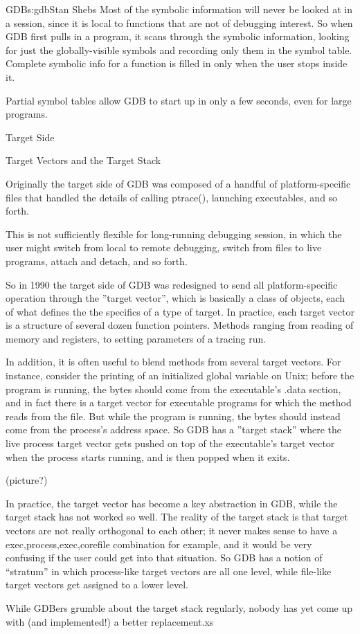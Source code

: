 \begin{aosachapter}{GDB}{s:gdb}{Stan Shebs}
Most of the symbolic information will never be looked at in a session,
since it is local to functions that are not of debugging interest.  So
when GDB first pulls in a program, it scans through the symbolic
information, looking for just the globally-visible symbols and
recording only them in the symbol table.  Complete symbolic info for a
function is filled in only when the user stops inside it.

Partial symbol tables allow GDB to start up in only a few seconds, even
for large programs.

Target Side

Target Vectors and the Target Stack

Originally the target side of GDB was composed of a handful of
platform-specific files that handled the details of calling ptrace(),
launching executables, and so forth.

This is not sufficiently flexible for long-running debugging session,
in which the user might switch from local to remote debugging, switch
from files to live programs, attach and detach, and so forth.

So in 1990 the target side of GDB was redesigned to send all
platform-specific operation through the ''target vector'', which is
basically a class of objects, each of what defines the the specifics
of a type of target.  In practice, each target vector is a structure
of several dozen function pointers.  Methods ranging from reading of
memory and registers, to setting parameters of a tracing run.

In addition, it is often useful to blend methods from several target
vectors.  For instance, consider the printing of an initialized global
variable on Unix; before the program is running, the bytes should come
from the executable's .data section, and in fact there is a target
vector for executable programs for which the method reads from the
file.  But while the program is running, the bytes should instead come
from the process's address space.  So GDB has a ''target stack'' where
the live process target vector gets pushed on top of the executable's
target vector when the process starts running, and is then popped when
it exits.

(picture?)

In practice, the target vector has become a key abstraction in GDB,
while the target stack has not worked so well.  The reality of the
target stack is that target vectors are not really orthogonal to each
other; it never makes sense to have a exec,process,exec,corefile
combination for example, and it would be very confusing if the user
could get into that situation.  So GDB has a notion of ``stratum'' in
which process-like target vectors are all one level, while file-like
target vectors get assigned to a lower level.

While GDBers grumble about the target stack regularly, nobody has yet
come up with (and implemented!) a better replacement.xs

\end{aosachapter}
